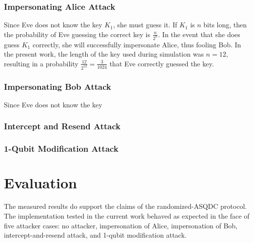 \documentclass[conference]{IEEEtran}
\begin{document}
\subsubsection{Impersonating Alice Attack}

Since Eve does not know the key $K_{1}$, she must guess it. If $K_{1}$
is $n$ bits long, then the probability of Eve guessing the correct
key is $\frac{n}{2^{n}}$. In the event that she does guess $K_{1}$
correctly, she will successfully impersonate Alice, thus fooling Bob.
In the present work, the length of the key used during simulation
was $n=12$, resulting in a probability $\frac{12}{2^{12}}=\frac{3}{1024}$
that Eve correctly guessed the key. 

\subsubsection{Impersonating Bob Attack}

Since Eve does not know the key 

\subsubsection{Intercept and Resend Attack}

\subsubsection{1-Qubit Modification Attack}

\section{Evaluation}

The measured results do support the claims of the randomized-ASQDC
protocol. The implementation tested in the current work behaved as
expected in the face of five attacker cases: no attacker, impersonation
of Alice, impersonation of Bob, intercept-and-resend attack, and 1-qubit
modification attack. 

\mydata
\end{document}

